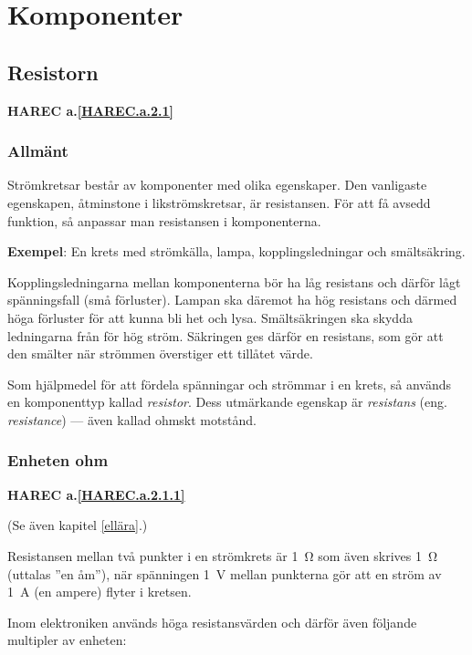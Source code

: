 \chapter{Komponenter}
\label{komponenter}

\section{Resistorn}
 \textbf{HAREC a.\ref{HAREC.a.2.1}\label{myHAREC.a.2.1}}

\subsection{Allmänt}

Strömkretsar består av komponenter med olika egenskaper.
Den vanligaste egenskapen, åtminstone i likströmskretsar,
är resistansen.  För att få avsedd funktion, så anpassar
man resistansen i komponenterna.

\noindent\textbf{Exempel}: En krets med strömkälla, lampa,
kopplingsledningar och smältsäkring.

Kopplingsledningarna mellan komponenterna bör ha låg
resistans och därför lågt spänningsfall (små förluster).
Lampan ska däremot ha hög resistans och därmed höga
förluster för att kunna bli het och lysa.
Smältsäkringen ska skydda ledningarna från för hög ström.
Säkringen ges därför en resistans, som gör att den smälter
när strömmen överstiger ett tillåtet värde.

Som hjälpmedel för att fördela spänningar och strömmar i
en krets, så används en komponenttyp kallad
\emph{resistor}.
Dess utmärkande egenskap är \emph{resistans}
(eng. \emph{resistance}) --- även kallad ohmskt motstånd.

\subsection{Enheten ohm}
\textbf{HAREC a.\ref{HAREC.a.2.1.1}\label{myHAREC.a.2.1.1}}

(Se även kapitel \ref{ellära}.)

Resistansen mellan två punkter i en strömkrets är
\SI{1}{\ohm} som även skrives \SI{1}{\ohm} (uttalas ''en
åm''), när spänningen \SI{1}{V} mellan punkterna gör att
en ström av \SI{1}{A} (en ampere) flyter i kretsen.

Inom elektroniken används höga resistansvärden och därför även följande
multipler av enheten:

